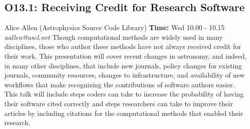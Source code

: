 \documentclass{report}
\begin{document}
\subsection*{O13.1: Receiving Credit for Research Software}
\bigskip
Alice Allen (Astrophysics Source Code Library) \newline   \newline   \newline   \newline  \newline  \newline\newline
{\bf Time:} Wed 10.00 - 10.15\newline
\newline
{\it aallen@ascl.net}\newline
\newline\newline
Though computational methods are widely used in many disciplines, those who author these methods have not always received credit for their work. This presentation will cover recent changes in astronomy, and indeed, in many other disciplines, that include new journals, policy changes for existing journals, community resources, changes to infrastructure, and availability of new workflows that make recognizing the contributions of software authors easier. This talk will include steps coders can take to increase the probability of having their software cited correctly and steps researchers can take to improve their articles by including citations for the computational methods that enabled their research.\newline
\newpage
\end{document}
